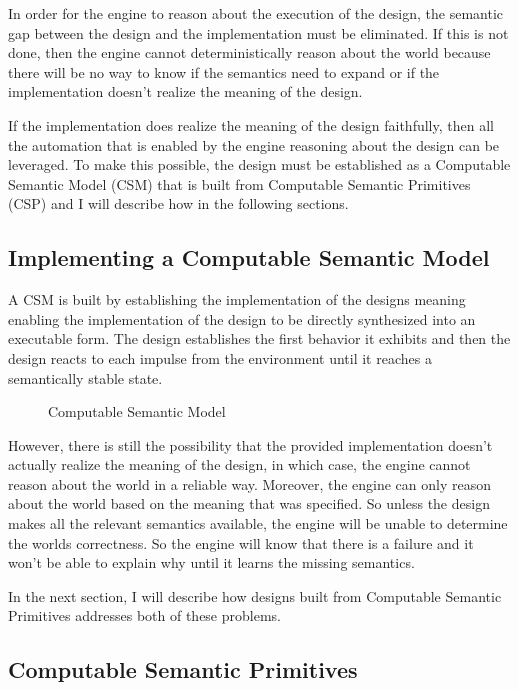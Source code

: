 In order for the engine to reason about the execution of the design, the semantic gap between the design and the implementation must be eliminated. If this is not done, then the engine cannot deterministically reason about the world because there will be no way to know if the semantics need to expand or if the implementation doesn't realize the meaning of the design.

If the implementation does realize the meaning of the design faithfully, then all the automation that is enabled by the engine reasoning about the design can be leveraged. To make this possible, the design must be established as a Computable Semantic Model (CSM) that is built from Computable Semantic Primitives (CSP) and I will describe how in the following sections.

\subsection{Implementing a Computable Semantic Model}
A CSM is built by establishing the implementation of the designs meaning enabling the implementation of the design to be directly synthesized into an executable form. The design establishes the first behavior it exhibits and then the design reacts to each impulse from the environment until it reaches a semantically stable state.

\begin{figure}[htbp]
    \centering
    
    \caption{Computable Semantic Model}
    \label{fig:csm}
\end{figure}

However, there is still the possibility that the provided implementation doesn't actually realize the meaning of the design, in which case, the engine cannot reason about the world in a reliable way. Moreover, the engine can only reason about the world based on the meaning that was specified. So unless the design makes all the relevant semantics available, the engine will be unable to determine the worlds correctness. So the engine will know that there is a failure and it won't be able to explain why until it learns the missing semantics.

In the next section, I will describe how designs built from Computable Semantic Primitives addresses both of these problems.

\subsection{Computable Semantic Primitives}

